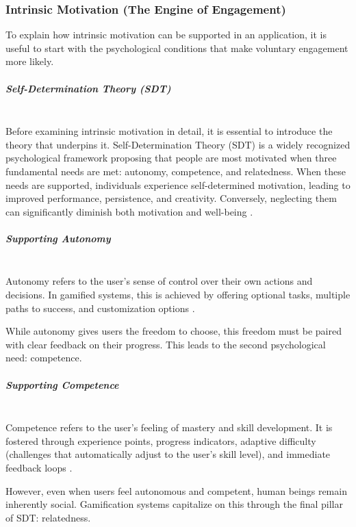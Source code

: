 \subsubsection{Intrinsic Motivation (The Engine of Engagement)}

To explain how intrinsic motivation can be supported in an application, it is useful to start with the psychological conditions that make voluntary engagement more likely.

\subparagraph{Self-Determination Theory (SDT)}
~\\
Before examining intrinsic motivation in detail, it is essential to introduce the theory that underpins it. Self-Determination Theory (SDT) is a widely recognized psychological framework proposing that people are most motivated when three fundamental needs are met: autonomy, competence, and relatedness.
When these needs are supported, individuals experience self-determined motivation, leading to improved performance, persistence, and creativity.
Conversely, neglecting them can significantly diminish both motivation and well-being \cite{bandhuMotivation2024, sdtOrgTheory}.

\vspace{-0.6em}
\subparagraph{Supporting Autonomy}
~\\
Autonomy refers to the user's sense of control over their own actions and decisions. 
In gamified systems, this is achieved by offering optional tasks, multiple paths to success, and customization options \cite{bandhuMotivation2024}.
\vspace{-0.4em}

While autonomy gives users the freedom to choose, this freedom must be paired with clear feedback on their progress. This leads to the second psychological need: competence.

\vspace{-0.6em}
\subparagraph{Supporting Competence}
~\\
Competence refers to the user's feeling of mastery and skill development. 
It is fostered through experience points, progress indicators, adaptive difficulty (challenges that automatically adjust to the user's skill level), and immediate feedback loops \cite{bandhuMotivation2024}.
\vspace{-0.4em}

However, even when users feel autonomous and competent, human beings remain inherently social. Gamification systems capitalize on this through the final pillar of SDT: relatedness.

